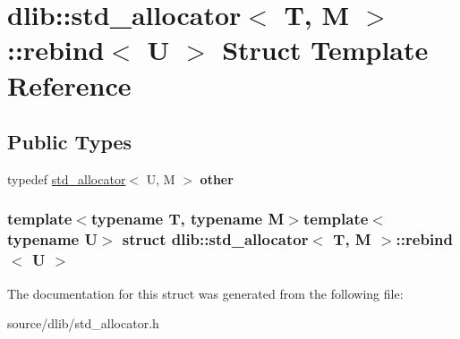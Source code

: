 \hypertarget{structdlib_1_1std__allocator_1_1rebind}{
\section{dlib::std\_\-allocator$<$ T, M $>$::rebind$<$ U $>$ Struct Template Reference}
\label{structdlib_1_1std__allocator_1_1rebind}
}
\subsection*{Public Types}
\begin{DoxyCompactItemize}
\item 
\hypertarget{structdlib_1_1std__allocator_1_1rebind_a90c3fff2cb39bc8692290016b39610b7}{
typedef \hyperlink{classdlib_1_1std__allocator}{std\_\-allocator}$<$ U, M $>$ {\bfseries other}}
\label{structdlib_1_1std__allocator_1_1rebind_a90c3fff2cb39bc8692290016b39610b7}

\end{DoxyCompactItemize}
\subsubsection*{template$<$typename T, typename M$>$template$<$typename U$>$ struct dlib::std\_\-allocator$<$ T, M $>$::rebind$<$ U $>$}



The documentation for this struct was generated from the following file:\begin{DoxyCompactItemize}
\item 
source/dlib/std\_\-allocator.h\end{DoxyCompactItemize}
